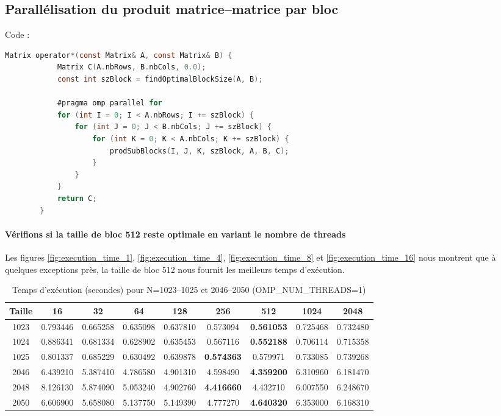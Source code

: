 \documentclass[a4paper,13pt]{book}
\begin{document}
\subsection{Parallélisation du produit matrice–matrice par bloc}
Code :  \\

	\begin{lstlisting}[language=C]
        Matrix operator*(const Matrix& A, const Matrix& B) {
            Matrix C(A.nbRows, B.nbCols, 0.0);
            const int szBlock = findOptimalBlockSize(A, B);
        
            #pragma omp parallel for
            for (int I = 0; I < A.nbRows; I += szBlock) {
                for (int J = 0; J < B.nbCols; J += szBlock) {
                    for (int K = 0; K < A.nbCols; K += szBlock) {
                        prodSubBlocks(I, J, K, szBlock, A, B, C);
                    }
                }
            }
            return C;
        }
\end{lstlisting}
\paragraph{Vérifions si la taille de bloc 512 reste optimale en variant le nombre de threads}
Les figures \ref{fig:execution_time_1}, \ref{fig:execution_time_4}, \ref{fig:execution_time_8} et \ref{fig:execution_time_16} nous montrent que à quelques exceptions près, la taille de bloc 512 nous fournit les meilleurs temps d'exécution.
\begin{table}[ht]
    \centering
    \caption{Temps d'exécution (secondes) pour N=1023--1025 et 2046--2050 (OMP\_NUM\_THREADS=1)}
    \label{tab:threads1}
    \begin{tabular}{|c|c|c|c|c|c|c|c|c|}\hline
    Taille & 16 & 32 & 64 & 128 & 256 & 512 & 1024 & 2048 \\\hline
    1023 & 0.793446 & 0.665258 & 0.635098 & 0.637810 & 0.573094 & \textbf{0.561053} & 0.725468 & 0.732480 \\\hline
    1024 & 0.886341 & 0.681334 & 0.628902 & 0.635453 & 0.567116 & \textbf{0.552188} & 0.706114 & 0.715358 \\\hline
    1025 & 0.801337 & 0.685229 & 0.630492 & 0.639878 & \textbf{0.574363} & 0.579971 & 0.733085 & 0.739268 \\\hline
    2046 & 6.439210 & 5.387410 & 4.786580 & 4.901310 & 4.598490 & \textbf{4.359200} & 6.310960 & 6.181470 \\\hline
    2048 & 8.126130 & 5.874090 & 5.053240 & 4.902760 & \textbf{4.416660} & 4.432710 & 6.007550 & 6.248670 \\\hline
    2050 & 6.606900 & 5.658080 & 5.137750 & 5.149390 & 4.777270 & \textbf{4.640320} & 6.353000 & 6.168310 \\\hline
    \end{tabular}
\end{table}
\end{document}
